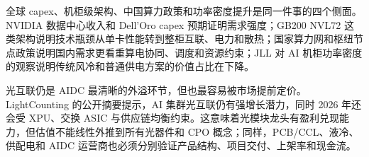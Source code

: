 全球 capex、机柜级架构、中国算力政策和功率密度提升是同一件事的四个侧面。NVIDIA 数据中心收入和 Dell'Oro capex 预期证明需求强度；GB200 NVL72 这类架构说明技术瓶颈从单卡性能转到整柜互联、电力和散热；国家算力网和枢纽节点政策说明国内需求更看重算电协同、调度和资源约束；JLL 对 AI 机柜功率密度的观察说明传统风冷和普通供电方案的价值占比在下降。

光互联仍是 AIDC 最清晰的外溢环节，但也最容易被市场提前定价。LightCounting 的公开摘要提示，AI 集群光互联仍有强增长潜力，同时 2026 年还会受 XPU、交换 ASIC 与供应链均衡约束。这意味着光模块龙头有盈利兑现能力，但估值不能线性外推到所有光器件和 CPO 概念；同样，PCB/CCL、液冷、供配电和 AIDC 运营商也必须分别验证产品结构、项目交付、上架率和现金流。
